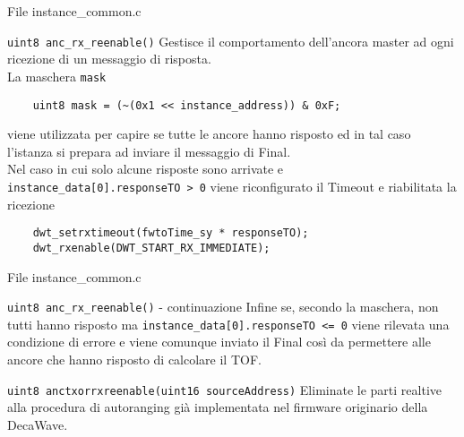 \begin{frame}[fragile, shirnk=30]{File instance\_common.c}
  \begin{block}{\lstinline!uint8 anc_rx_reenable()!}
    Gestisce il comportamento dell'ancora master ad ogni ricezione di un messaggio di risposta.\\
    La maschera \lstinline!mask!
    \begin{lstlisting}
    uint8 mask = (~(0x1 << instance_address)) & 0xF;
    \end{lstlisting}
    viene utilizzata per capire se tutte le ancore hanno risposto ed in tal caso l'istanza si prepara ad inviare il messaggio di Final.\\
    Nel caso in cui solo alcune risposte sono arrivate e \lstinline!instance_data[0].responseTO > 0! viene riconfigurato il Timeout e riabilitata
    la ricezione 
    \begin{lstlisting}
    dwt_setrxtimeout(fwtoTime_sy * responseTO); 
    dwt_rxenable(DWT_START_RX_IMMEDIATE);
    \end{lstlisting}
  \end{block}
\end{frame}

\begin{frame}{File instance\_common.c}
  \begin{block}{\lstinline!uint8 anc_rx_reenable()! - continuazione}
    Infine se, secondo la maschera, non tutti hanno risposto ma \lstinline!instance_data[0].responseTO <= 0! viene
    rilevata una condizione di errore e viene comunque inviato il Final così da permettere alle ancore che hanno risposto di calcolare il TOF.
  \end{block}
  \begin{block}{\lstinline!uint8 anctxorrxreenable(uint16 sourceAddress)!}
    Eliminate le parti realtive alla procedura di autoranging già implementata nel firmware originario della DecaWave.
  \end{block}
\end{frame}

